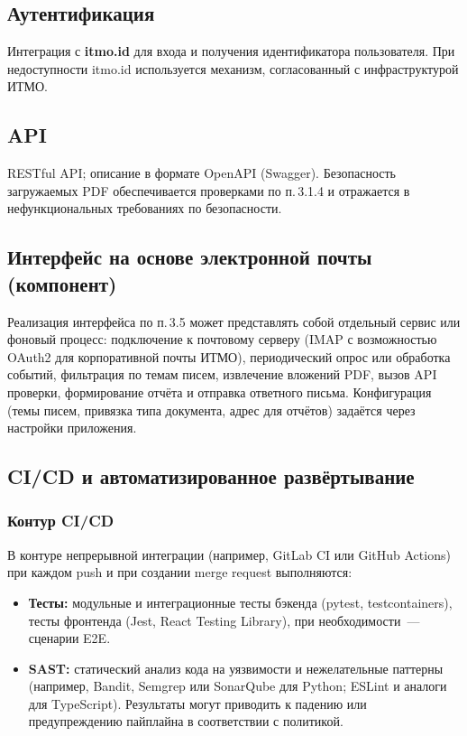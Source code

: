 \subsection{Аутентификация}

Интеграция с \textbf{itmo.id} для входа и получения идентификатора пользователя. При недоступности itmo.id используется механизм, согласованный с инфраструктурой ИТМО.

\subsection{API}

RESTful API; описание в формате OpenAPI (Swagger). Безопасность загружаемых PDF обеспечивается проверками по п.\,3.1.4 и отражается в нефункциональных требованиях по безопасности.

\subsection{Интерфейс на основе электронной почты (компонент)}

Реализация интерфейса по п.\,3.5 может представлять собой отдельный сервис или фоновый процесс: подключение к почтовому серверу (IMAP с возможностью OAuth2 для корпоративной почты ИТМО), периодический опрос или обработка событий, фильтрация по темам писем, извлечение вложений PDF, вызов API проверки, формирование отчёта и отправка ответного письма. Конфигурация (темы писем, привязка типа документа, адрес для отчётов) задаётся через настройки приложения.

\subsection{CI/CD и автоматизированное развёртывание}

\subsubsection{Контур CI/CD}

В контуре непрерывной интеграции (например, GitLab CI или GitHub Actions) при каждом push и при создании merge request выполняются:
\begin{itemize}
  \item \textbf{Тесты:} модульные и интеграционные тесты бэкенда (pytest, testcontainers), тесты фронтенда (Jest, React Testing Library), при необходимости~--- сценарии E2E.
  \item \textbf{SAST:} статический анализ кода на уязвимости и нежелательные паттерны (например, Bandit, Semgrep или SonarQube для Python; ESLint и аналоги для TypeScript). Результаты могут приводить к падению или предупреждению пайплайна в соответствии с политикой.
\end{itemize}

